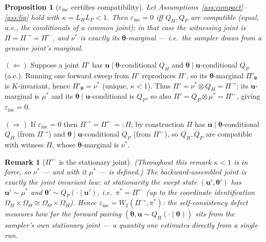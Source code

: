 \documentclass[11pt]{article}
\makeatletter
\theoremstyle{definitionbreak}
\theoremstyle{plainbreak}
\newtheorem{proposition}[theorem]{Proposition}
\theoremstyle{remarkbreak}
\newtheorem{remark}{Remark}[section]
\renewenvironment{proof}[1][\proofname]{\par
  \pushQED{\qed}\normalfont
  \topsep6\p@\@plus6\p@\relax
  \trivlist
  \item[\hskip\labelsep\itshape #1\@addpunct{.}]\mbox{}\par\nobreak\ignorespaces
}{\popQED\endtrivlist\@endpefalse}
\newcommand{\Om}{\Omega}
\newcommand{\bth}{\bm{\theta}}
\makeatother
\begin{document}
\begin{proposition}[$\varepsilon_{\mathrm{inc}}$ certifies compatibility]
\label{prop:inc}
Let Assumptions~\ref{ass:compact}--\ref{ass:lip} hold with $\kappa=L_HL_P<1$. Then
$\varepsilon_{\mathrm{inc}}=0$ iff $Q_H,Q_P$ are compatible (equal, a.e., the conditionals of a
common joint); in that case the witnessing joint is $\Pi=\Pi^\rightarrow=\Pi^\leftarrow$, and
$\nu^\ast$ is exactly its $\bth$-marginal --- i.e.\ the sampler draws from a genuine joint's marginal.
\end{proposition}
\begin{proof}
$(\Leftarrow)$ Suppose a joint $\Pi'$ has $\bm u\mid\bth$-conditional $Q_H$ and
$\bth\mid\bm u$-conditional $Q_P$ (a.e.). Running one forward sweep from $\Pi'$ reproduces $\Pi'$, so
its $\bth$-marginal $\Pi'_{\bth}$ is $K$-invariant, hence $\Pi'_{\bth}=\nu^\ast$ (unique, $\kappa<1$).
Thus $\Pi'=\nu^\ast\otimes Q_H=\Pi^\rightarrow$; its $\bm u$-marginal is $\mu^\ast$ and its
$\bth\mid\bm u$-conditional is $Q_P$, so also $\Pi'=Q_P\otimes\mu^\ast=\Pi^\leftarrow$, giving
$\varepsilon_{\mathrm{inc}}=0$.

$(\Rightarrow)$ If $\varepsilon_{\mathrm{inc}}=0$ then $\Pi^\rightarrow=\Pi^\leftarrow=:\Pi$; by
construction $\Pi$ has $\bm u\mid\bth$-conditional $Q_H$ (from $\Pi^\rightarrow$) and
$\bth\mid\bm u$-conditional $Q_P$ (from $\Pi^\leftarrow$), so $Q_H,Q_P$ are compatible with witness
$\Pi$, whose $\bth$-marginal is $\nu^\ast$.
\end{proof}

\begin{remark}[$\Pi^\leftarrow$ is the stationary joint]
\label{rem:pileftpi}
(Throughout this remark $\kappa<1$ is in force, so $\nu^\ast$ --- and with it $\mu^\ast$ --- is
defined.) The backward-assembled joint is exactly the joint invariant law: at stationarity the swept
state $(\bm u',\bth')$ has $\bm u'\sim\mu^\ast$ and $\bth'\sim Q_P(\cdot\mid\bm u')$, i.e.\
$\pi^\ast=\Pi^\leftarrow$ (up to the coordinate identification
$\Om_H\times\Om_\Theta\cong\Om_\Theta\times\Om_H$). Hence
$\varepsilon_{\mathrm{inc}}=W_2(\Pi^\rightarrow,\pi^\ast)$: the self-consistency defect measures how
far the forward pairing $(\bth,\bm u\!\sim\!Q_H(\cdot\mid\bth))$ sits from the sampler's own
stationary joint --- a quantity one estimates directly from a single run.
\end{remark}
\end{document}
